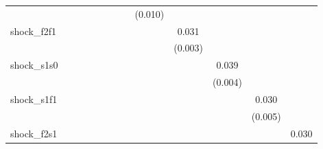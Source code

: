 {\begin{tabular}{l*{12}{c}}
            &                     &                     &                     &                     &                     &                     &                     &     (0.010)         &                     &                     &                     &                     \\
\addlinespace
shock\_f2f1  &                     &                     &                     &                     &                     &                     &                     &                     &       0.031\sym{***}&                     &                     &                     \\
            &                     &                     &                     &                     &                     &                     &                     &                     &     (0.003)         &                     &                     &                     \\
\addlinespace
shock\_s1s0  &                     &                     &                     &                     &                     &                     &                     &                     &                     &       0.039\sym{***}&                     &                     \\
            &                     &                     &                     &                     &                     &                     &                     &                     &                     &     (0.004)         &                     &                     \\
\addlinespace
shock\_s1f1  &                     &                     &                     &                     &                     &                     &                     &                     &                     &                     &       0.030\sym{***}&                     \\
            &                     &                     &                     &                     &                     &                     &                     &                     &                     &                     &     (0.005)         &                     \\
\addlinespace
shock\_f2s1  &                     &                     &                     &                     &                     &                     &                     &                     &                     &                     &                     &       0.030\sym{***}\\

\end{tabular}}
